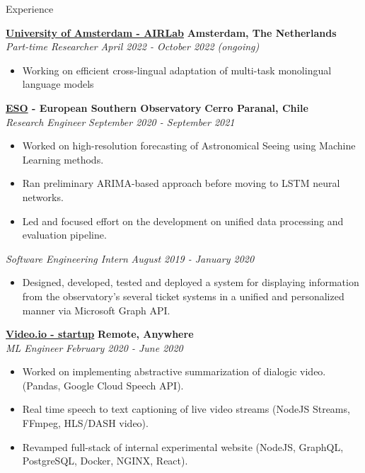 \documentclass{resume} %
\begin{document}
\begin{rSection}{Experience}

	{\bf \href{https://icai.ai/airlab/}{University of Amsterdam - AIRLab}} \hfill \textbf{Amsterdam,
			The Netherlands}
	\\ \textit{Part-time Researcher} \hfill {\em April 2022 - October 2022 (ongoing)}
	\begin{itemize}\vspace{-0.5em}
		\item Working on efficient cross-lingual adaptation of multi-task monolingual language models
	\end{itemize}

	{\bf \href{https://www.eso.org}{ESO} - European Southern Observatory} \hfill \textbf{Cerro Paranal, Chile}
	\\ \textit{Research Engineer} \hfill {\em September 2020 - September 2021}
	\begin{itemize}\vspace{-0.5em}
		\item Worked on high-resolution forecasting of Astronomical Seeing using Machine Learning
		      methods.
		\item Ran preliminary ARIMA-based approach before moving to LSTM neural networks.
		\item Led and focused effort on the development on unified data processing and evaluation
		      pipeline.
	\end{itemize}
	\textit{Software Engineering Intern} \hfill {\em August 2019 - January 2020}
	\begin{itemize}\vspace{-0.5em}
		\item Designed, developed, tested and deployed a system for displaying information from the
		      observatory's several ticket systems in a unified and personalized manner via Microsoft Graph
		      API.
	\end{itemize}

	{\bf \href{https://video.io/}{Video.io - startup}} \hfill \textbf{Remote, Anywhere}
	\\ \textit{ML Engineer} \hfill {\em February 2020 - June 2020}
	\begin{itemize}\vspace{-0.5em}
		\item Worked on implementing abstractive summarization of dialogic video. (Pandas, Google Cloud
		      Speech API).
		\item Real time speech to text captioning of live video streams (NodeJS Streams, FFmpeg,
		      HLS/DASH video).
		\item Revamped full-stack of internal experimental website (NodeJS, GraphQL, PostgreSQL, Docker,
		      NGINX, React).
	\end{itemize}


\end{rSection}
\end{document}
